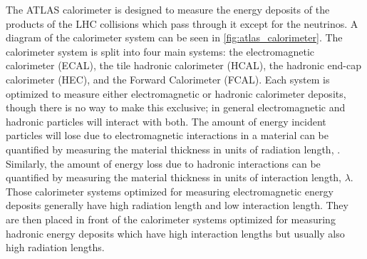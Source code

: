 The ATLAS calorimeter is designed to measure the energy
deposits of the products of the LHC collisions which pass through
it except for the neutrinos.  A diagram of the 
calorimeter system can be seen in \fig\ref{fig:atlas_calorimeter}.
The calorimeter system is split into four main systems:
the electromagnetic calorimeter (ECAL), the 
tile hadronic calorimeter (HCAL), the hadronic 
end-cap calorimeter (HEC), 
and the Forward Calorimeter (FCAL).
Each system is optimized to measure either electromagnetic
or hadronic calorimeter deposits, though there is no
way to make this exclusive; in general 
electromagnetic and hadronic particles will interact with both.
The amount of energy incident particles will lose due to electromagnetic
interactions in a material can be quantified by measuring the material thickness
in units of radiation length, \xzero. Similarly, the amount of energy loss
due to hadronic interactions can be quantified by measuring the material
thickness in units of interaction length, $\lambda$.
Those calorimeter systems optimized for measuring electromagnetic 
energy deposits generally have high radiation length and low interaction
length. They are then placed in front of the calorimeter systems
optimized for measuring hadronic energy deposits which have high
interaction lengths but usually also high radiation lengths. 


